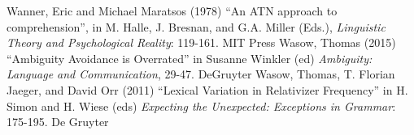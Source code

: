 \documentclass[a4paper]{article}
\begin{document}
\newline    
\newline
Wanner, Eric and Michael Maratsos (1978) ``An ATN approach to comprehension'', in M. Halle, J. Bresnan, and G.A. Miller (Eds.), {\it Linguistic Theory and Psychological Reality}: 119-161. MIT Press
\newline
\newline
Wasow, Thomas  (2015) ``Ambiguity Avoidance is Overrated'' in Susanne Winkler (ed) {\it Ambiguity: Language and Communication}, 29-47. DeGruyter
 \newline
\newline
Wasow, Thomas, T. Florian Jaeger, and David Orr (2011) ``Lexical Variation in Relativizer Frequency'' in H. Simon and H. Wiese (eds) {\it Expecting the Unexpected: Exceptions in Grammar}: 175-195. De Gruyter 
\end{document}
